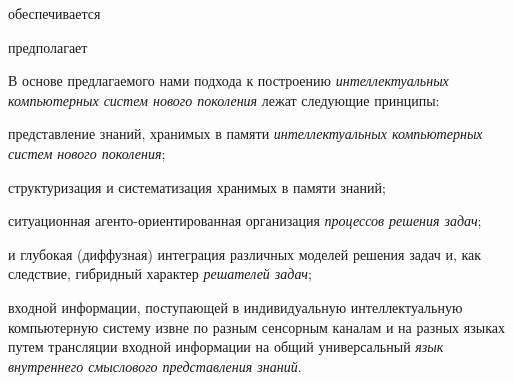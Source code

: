 \begin{SCn}
	\begin{scnrelfromlist}{обеспечивается}
	\end{scnrelfromlist}


	\begin{scnrelfromlist}{предполагает}
		\begin{scnindent}
		\end{scnindent}
	\end{scnrelfromlist}

\end{SCn}



В основе предлагаемого нами подхода к построению \textit{интеллектуальных компьютерных систем нового поколения} лежат следующие принципы:
\begin{textitemize}
	\item {} представление знаний, хранимых в памяти \textit{интеллектуальных компьютерных систем нового поколения};
	\item {} структуризация и систематизация хранимых в памяти знаний;
	\item {} ситуационная агенто-ориентированная организация \textit{процессов решения задач};
	\item {} и глубокая (диффузная) интеграция различных моделей решения задач и, как следствие, гибридный характер \textit{решателей задач};
	\item {} входной информации, поступающей в индивидуальную интеллектуальную компьютерную систему извне по разным сенсорным каналам и на разных языках путем трансляции входной информации на общий универсальный \textit{язык внутреннего смыслового представления знаний}.
\end{textitemize}

